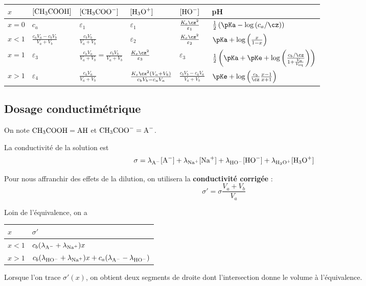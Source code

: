 \documentclass{tp}
\begin{document}
\begin{tabular}{llllll}
  \toprule
$x$ & $[\ce{CH3COOH}]$ & $[\ce{CH3COO-}]$  & $[\ce{H3O+}]$ & $[\ce{HO-}]$ & pH \\
  \midrule
  $x=0$ & $c_a$ & $\varepsilon_1$ & $\varepsilon_1$ & $\frac{K_e\cz^2}{\varepsilon_1}$  & $\frac{1}{2}\left( \pKa - \log\left( c_a/\cz \right)  \right) $  \\
  $x<1$ & $\frac{c_aV_a-c_bV_b}{V_a+V_b}$ & $\frac{c_bV_b}{V_a+V_b}$ & $\varepsilon_2$ & $\frac{K_e\cz^2}{\varepsilon_2}$ & $\pKa + \log\left( \frac{x}{1-x} \right) $ \\
  $x=1$ & $\varepsilon_3$ & $\frac{c_aV_a}{V_a+V_b} = \frac{c_bV_b}{V_a+V_b}$ & $\frac{K_e\cz^2}{\varepsilon_3}$ & $\varepsilon_3$ & $\frac{1}{2}\left( \pKa + \pKe + \log\left( \frac{c_b/\cz}{1+\frac{V_a}{V_\text{eq}}} \right)  \right) $ \\
  $x>1$ & $\varepsilon_4$ & $\frac{c_aV_a}{V_a+V_b} $ & $\frac{K_e\cz^2( V_a+V_b)}{c_bV_b-c_aV_a}$ & $\frac{c_bV_b-c_aV_a}{V_a+V_b}$ & $\pKe + \log\left( \frac{c_b}{\cz} \frac{x-1}{x+1} \right) $ \\
  \bottomrule
\end{tabular}

\subsection{Dosage conductimétrique}%
\label{sub:dosage_conductimetrique}
On note $\ce{CH3COOH}=\ce{AH}$  et $\ce{CH3COO-}=\ce{A-}$. 

La conductivité de la solution est 
\begin{equation}
  \sigma = \lambda_{\ce{A-}}[\ce{A-}] +\lambda_{\ce{Na+}}[\ce{Na+}] + \lambda_{\ce{HO-}}[\ce{HO-}] + \lambda_{\ce{H3O+}}[\ce{H3O+}]
\end{equation}

Pour nous affranchir des effets de la dilution, on utilisera la \textbf{conductivité corrigée} : 
\begin{equation}
  \sigma' = \sigma \frac{V_a+V_b}{V_a}
\end{equation}

Loin de l'équivalence, on a
\begin{center}
\begin{tabular}{ll}
  \toprule
  $x$ & $\sigma'$ \\
  \midrule
  $x<1$ & $c_b(\lambda_{\ce{A-}}+\lambda_{\ce{Na+}})x$  \\
  $x>1$ & $c_b(\lambda_{\ce{HO-}}+\lambda_{\ce{Na+}})x + c_a(\lambda_{\ce{A-}}-\lambda_{\ce{HO-}}) $ \\
  \bottomrule
\end{tabular}
\end{center}
Lorsque l'on trace $\sigma'(x)$, on obtient deux segments de droite dont l'intersection donne le volume à l'équivalence.
\end{document}
